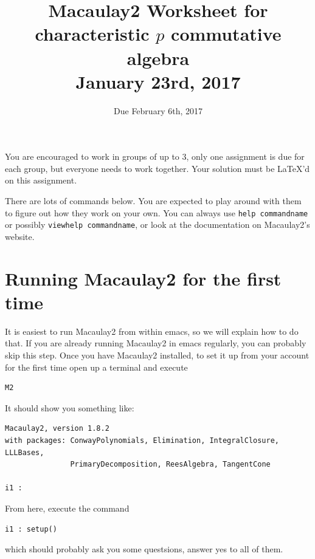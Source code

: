 \documentclass[12pt]{amsart}
\numberwithin{equation}{theorem}
\renewcommand{\:}{\colon}
\begin{document}
\title{Macaulay2 Worksheet for characteristic $p$ commutative algebra\\January 23rd, 2017}
\author{Due February 6th, 2017}



\maketitle

%
%

You are encouraged to work in groups of up to 3, only one assignment is due for each group, but everyone needs to work together.  Your solution must be LaTeX'd on this assignment.

There are lots of commands below.  You are expected to play around with them to figure out how they work on your own.  You can always use {\tt help commandname} or possibly {\tt viewhelp commandname}, or look at the documentation on Macaulay2's website.

\section{Running Macaulay2 for the first time}

It is easiest to run Macaulay2 from within emacs, so we will explain how to do that.  If you are already running Macaulay2 in emacs regularly, you can probably skip this step.  Once you have Macaulay2 installed, to set it up from your account for the first time open up a terminal and execute
\begin{verbatim}
M2
\end{verbatim}
It should show you something like:
\begin{verbatim}
Macaulay2, version 1.8.2
with packages: ConwayPolynomials, Elimination, IntegralClosure, LLLBases,
               PrimaryDecomposition, ReesAlgebra, TangentCone

i1 :
\end{verbatim}
From here, execute the command
\begin{verbatim}
i1 : setup()
\end{verbatim}
which should probably ask you some questsions, answer yes to all of them.
\end{document}
